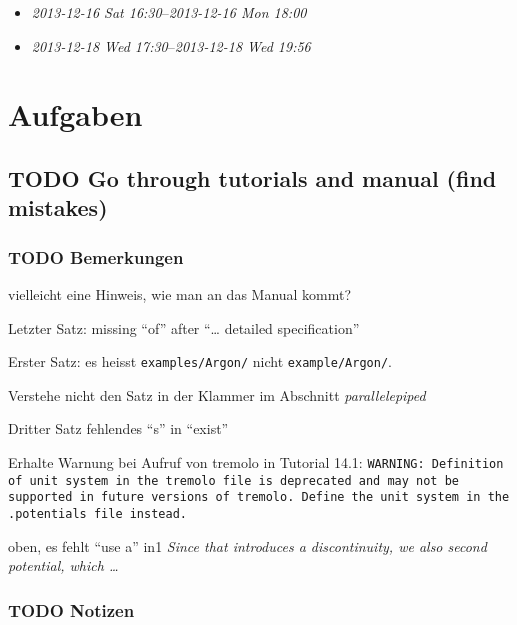 \documentclass[11pt]{article}
\begin{document}
\begin{itemize}
\item \textit{2013-12-16 Sat 16:30}--\textit{2013-12-16 Mon 18:00}
\item \textit{2013-12-18 Wed 17:30}--\textit{2013-12-18 Wed 19:56}
\end{itemize}
\section{Aufgaben}
\label{sec-4}


\subsection{\textbf{TODO} Go through tutorials and manual (find mistakes)}
\label{sec-4.1}


\subsubsection{\textbf{TODO} Bemerkungen}
\label{sec-4.1.1}

\begin{description}
\item vielleicht eine Hinweis, wie man an das Manual kommt?
\item [page 7] Letzter Satz: missing ``of'' after ``\ldots{} detailed specification''
\item [page 11] Erster Satz: es heisst \texttt{examples/Argon/} nicht \texttt{example/Argon/}.
\item [page 17] Verstehe nicht den Satz in der Klammer im Abschnitt \emph{parallelepiped}
\item [page 105] Dritter Satz fehlendes ``s'' in ``exist''
\item [page 105]Erhalte Warnung bei Aufruf von tremolo in Tutorial 14.1: \texttt{WARNING: Definition of unit system in the tremolo file is deprecated and may not be supported in future versions of tremolo. Define the unit system in the .potentials file instead.}
\item [page 107] oben, es fehlt ``use a'' in1 \emph{Since that introduces a discontinuity, we also second potential, which \ldots{}}
\end{description}
\subsubsection{\textbf{TODO} Notizen}
\label{sec-4.1.2}
\end{document}
